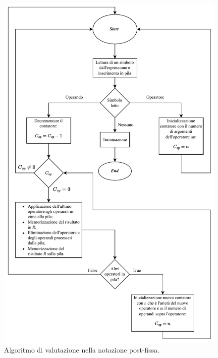 \documentclass[a4paper]{article}
\begin{document}
	\begin{figure}[!htp]
		\centering
		\includegraphics[width=\textwidth]{img/algoritmo_notazione_pre-fissa.pdf}
		\caption{Algoritmo di valutazione nella notazione post-fissa.}
	\end{figure}\newpage
	
\end{document}

